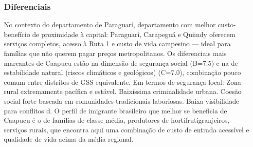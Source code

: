 \subsubsection*{Diferenciais}\label{dif-caapucu-0903}
No contexto do departamento de Paraguarí, departamento com melhor custo-benefício de proximidade à capital: Paraguarí, Carapeguá e Quiindy oferecem serviços completos, acesso à Ruta 1 e custo de vida campesino — ideal para famílias que não querem pagar preços metropolitanos. Os diferenciais mais marcantes de Caapucu estão na dimensão de segurança social (B=7.5) e na de estabilidade natural (riscos climáticos e geológicos) (C=7.0), combinação pouco comum entre distritos de GSS equivalente. Em termos de segurança local: Zona rural extremamente pacífica e estável. Baixíssima criminalidade urbana. Coesão social forte baseada em comunidades tradicionais laboriosas. Baixa visibilidade para conflitos d. O perfil de imigrante brasileiro que melhor se beneficia de Caapucu é o de famílias de classe média, produtores de hortifrutigranjeiros, serviços rurais, que encontra aqui uma combinação de custo de entrada acessível e qualidade de vida acima da média regional.
